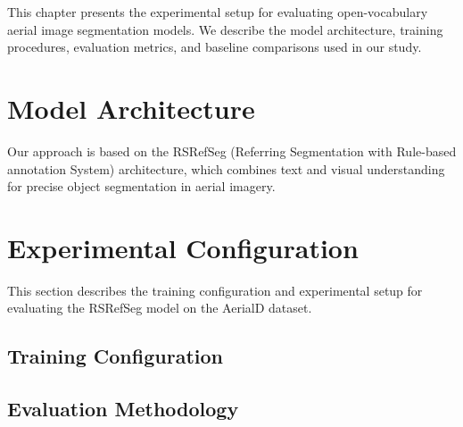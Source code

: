 \cleardoublepage
\label{chap:evaluation}

This chapter presents the experimental setup for evaluating open-vocabulary aerial image segmentation models. We describe the model architecture, training procedures, evaluation metrics, and baseline comparisons used in our study.

\section{Model Architecture}

Our approach is based on the RSRefSeg (Referring Segmentation with Rule-based annotation System) architecture, which combines text and visual understanding for precise object segmentation in aerial imagery.



\section{Experimental Configuration} 
This section describes the training configuration and experimental setup for evaluating the RSRefSeg model on the AerialD dataset.




\subsection{Training Configuration}


\subsection{Evaluation Methodology}

